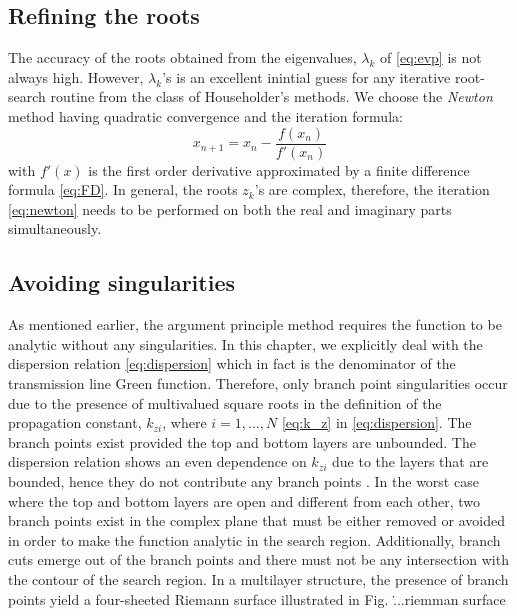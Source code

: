 \documentclass[12pt]{article}
\begin{document}
\subsection{Refining the roots}
%
The accuracy of the roots obtained from the eigenvalues, $\lambda_k$ of \eqref{eq:evp} is not always high. However, $\lambda_k$'s is an excellent inintial guess for any iterative root-search routine from the class of Householder's methods. We choose the \emph{Newton} method \cite{press2007numerical} having quadratic convergence and the iteration formula:
%
\begin{equation}
  x_{n+1} = x_n - \frac {f(x_n)}{f'(x_n)}
  \label{eq:newton}
\end{equation}
%
with $f'(x)$ is the first order derivative approximated by a finite difference formula \eqref{eq:FD}. In general, the roots $z_k$'s are complex, therefore, the iteration \eqref{eq:newton} needs to be performed on both the real and imaginary parts simultaneously.
\subsection{Avoiding singularities}
%
As mentioned earlier, the argument principle method requires the function to be analytic without any singularities. In this chapter, we explicitly deal with the dispersion relation \eqref{eq:dispersion} which in fact is the denominator of the transmission line Green function. Therefore, only branch point singularities occur due to the presence of multivalued square roots in the definition of the propagation constant, $k_{zi}$, where $i = 1,\dots, N$ \eqref{eq:k_z} in \eqref{eq:dispersion}. The branch points exist provided the top and bottom layers are unbounded. The dispersion relation shows an even dependence on $k_{zi}$ due to the layers that are bounded, hence they do not  contribute any branch points \cite[Section~5.3a]{felsen1994}. In the worst case where the top and bottom layers are open and different from each other, two branch points exist in the complex plane that must be either removed or avoided in order to make the function analytic in the search region. Additionally, branch cuts emerge out of the branch points and there must not be any intersection with the contour of the search region. In a multilayer structure, the presence of branch points yield a four-sheeted Riemann surface illustrated in Fig. \....{riemman surface}
\end{document}
